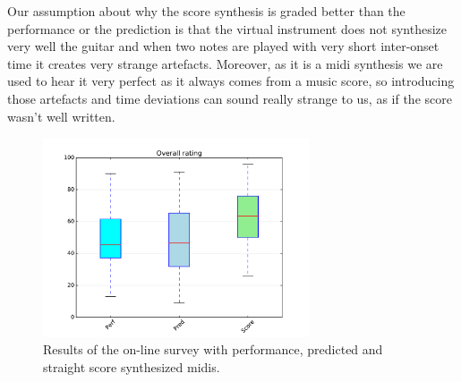 Our assumption about why the score synthesis is graded better than the performance or the prediction is that the virtual instrument does not synthesize very well the guitar and when two notes are played with very short inter-onset time it creates very strange artefacts. Moreover, as it is a midi synthesis we are used to hear it very perfect as it always comes from a music score, so introducing those artefacts and time deviations can sound really strange to us, as if the score wasn't well written.

\begin{figure}[ht!]
\caption{Results of the on-line survey with performance, predicted and straight score synthesized midis.}
\label{fig:survey}
\centering
\includegraphics[width=0.7\textwidth]{Figures/survey.pdf}
\end{figure}


\cleardoublepage

